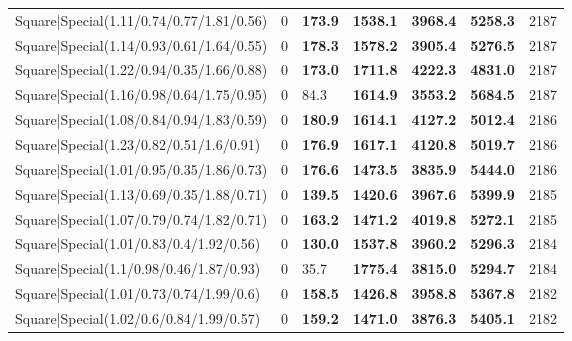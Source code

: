 \begin{tabular}{lrllllr}
 Square|Special(1.11/0.74/0.77/1.81/0.56)                      &             0   & \textbf{173.9} & \textbf{1538.1} & \textbf{3968.4} & \textbf{5258.3} &         2187 \\
 Square|Special(1.14/0.93/0.61/1.64/0.55)                      &             0   & \textbf{178.3} & \textbf{1578.2} & \textbf{3905.4} & \textbf{5276.5} &         2187 \\
 Square|Special(1.22/0.94/0.35/1.66/0.88)                      &             0   & \textbf{173.0} & \textbf{1711.8} & \textbf{4222.3} & \textbf{4831.0} &         2187 \\
 Square|Special(1.16/0.98/0.64/1.75/0.95)                      &             0   & 84.3           & \textbf{1614.9} & \textbf{3553.2} & \textbf{5684.5} &         2187 \\
 Square|Special(1.08/0.84/0.94/1.83/0.59)                      &             0   & \textbf{180.9} & \textbf{1614.1} & \textbf{4127.2} & \textbf{5012.4} &         2186 \\
 Square|Special(1.23/0.82/0.51/1.6/0.91)                       &             0   & \textbf{176.9} & \textbf{1617.1} & \textbf{4120.8} & \textbf{5019.7} &         2186 \\
 Square|Special(1.01/0.95/0.35/1.86/0.73)                      &             0   & \textbf{176.6} & \textbf{1473.5} & \textbf{3835.9} & \textbf{5444.0} &         2186 \\
 Square|Special(1.13/0.69/0.35/1.88/0.71)                      &             0   & \textbf{139.5} & \textbf{1420.6} & \textbf{3967.6} & \textbf{5399.9} &         2185 \\
 Square|Special(1.07/0.79/0.74/1.82/0.71)                      &             0   & \textbf{163.2} & \textbf{1471.2} & \textbf{4019.8} & \textbf{5272.1} &         2185 \\
 Square|Special(1.01/0.83/0.4/1.92/0.56)                       &             0   & \textbf{130.0} & \textbf{1537.8} & \textbf{3960.2} & \textbf{5296.3} &         2184 \\
 Square|Special(1.1/0.98/0.46/1.87/0.93)                       &             0   & 35.7           & \textbf{1775.4} & \textbf{3815.0} & \textbf{5294.7} &         2184 \\
 Square|Special(1.01/0.73/0.74/1.99/0.6)                       &             0   & \textbf{158.5} & \textbf{1426.8} & \textbf{3958.8} & \textbf{5367.8} &         2182 \\
 Square|Special(1.02/0.6/0.84/1.99/0.57)                       &             0   & \textbf{159.2} & \textbf{1471.0} & \textbf{3876.3} & \textbf{5405.1} &         2182 \\

\end{tabular}
